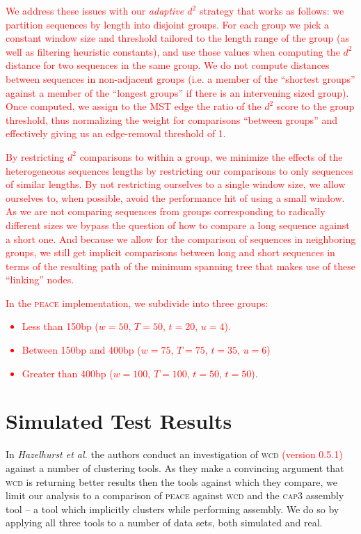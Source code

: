 \documentclass[a4paper,12pt]{article}
\newcommand{\mc}[1]{\textcolor{red}{#1}}
\begin{document}
\begin{appendix}
\mc{We address these issues with our {\it adaptive $d^2$} strategy that
works as follows: we partition sequences by length into disjoint groups.  For each
group we pick a constant window size and threshold tailored to the
length range of the group (as well as filtering heuristic constants),
and use those values when computing the $d^2$ distance for two
sequences in the same group.  We do not compute distances between
sequences in non-adjacent groups (i.e. a member of the ``shortest
groups'' against a member of the ``longest groups'' if there is an
intervening sized group).  Once computed, we assign to the MST
edge the ratio of the $d^2$ score to the group threshold, thus
normalizing the weight for comparisons ``between groups'' and
effectively giving us an edge-removal threshold of 1.}

\mc{By restricting $d^2$ comparisons to within a group, we minimize
  the effects of the heterogeneous sequences lengths by restricting
  our comparisons to only sequences of similar lengths.  By not
  restricting ourselves to a single window size, we allow ourselves
  to, when possible, avoid the performance hit of using a small
  window.  As we are not comparing sequences from groups corresponding
  to radically different sizes we bypass the question of how to
  compare a long sequence against a short one.  And because we allow
  for the comparison of sequences in neighboring groups, we still get
  implicit comparisons between long and short sequences in terms of
  the resulting path of the minimum spanning tree that makes use of
  these ``linking'' nodes.}

\mc{In the \textsc{peace} implementation, we subdivide into three groups:
\begin{itemize}
\item Less than 150bp ($w=50$, $T=50$, $t=20$, $u=4$).
\item Between 150bp and 400bp ($w=75$, $T=75$, $t=35$, $u=6$)
\item Greater than 400bp ($w=100$, $T=100$, $t=50$, $t=50$).
\end{itemize}}




\section{Simulated Test Results}

In {\it Hazelhurst et al.} \cite{Hazelhurst08a} the authors conduct
an investigation of \textsc{wcd} \mc{(version 0.5.1)} against a number of clustering
tools.  As they make a convincing argument that \textsc{wcd} is returning
better results then the tools against which they compare, we limit our
analysis to a comparison of \textsc{peace} against \textsc{wcd} and the \textsc{cap3} assembly
tool \cite{Huang99} -- a tool which implicitly clusters while
performing assembly.  We do so by applying all three tools to a number
of data sets, both simulated and real.


\end{appendix}
\end{document}
